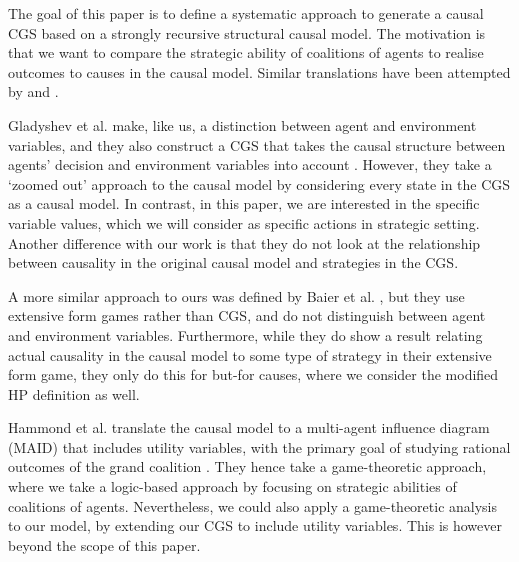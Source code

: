The goal of this paper is to define a systematic approach to generate a causal CGS based on a strongly recursive structural causal model. The motivation is that we want to compare the strategic ability of coalitions of agents to realise outcomes to causes in the causal model.
Similar translations have been attempted by \cite{gladyshev2023dynamics,baier2021game-theoretic} and \cite{hammond2023ReasoningCausalityGames}.

Gladyshev et al. make, like us, a distinction between agent and environment variables, and they also construct a CGS that takes the causal structure between agents' decision and environment variables into account \cite{gladyshev2023dynamics} . 
However, they take a `zoomed out' approach to the causal model by considering every state in the CGS as a causal model. 
In contrast, in this paper, we are interested in the specific variable values, which we will consider as specific actions in strategic setting.
Another difference with our work is that they do not look at the relationship between causality in the original causal model and strategies in the CGS.

A more similar approach to ours was defined by Baier et al. \cite{baier2021game-theoretic}, but they use extensive form games rather than CGS, and  do not distinguish between agent and environment variables. 
Furthermore, while they do show a result relating actual causality in the causal model to some type of strategy in their extensive form game, they only do this for but-for causes, where we consider the modified HP definition as well. 

Hammond et al. translate the causal model to a multi-agent influence diagram (MAID) that includes utility variables, with the primary goal of studying rational outcomes of the grand coalition \cite{hammond2023ReasoningCausalityGames}.
They hence take a game-theoretic approach, where we take a logic-based approach by focusing on strategic abilities of coalitions of agents.
Nevertheless, we could also apply a game-theoretic analysis to our model, by extending our CGS to include utility variables.
This is however beyond the scope of this paper.


